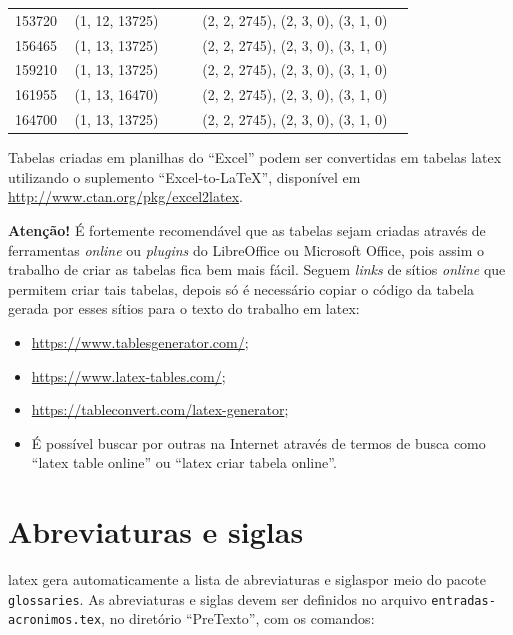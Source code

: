 \begin{longtable}{@{}p{0.14\linewidth}p{0.30\linewidth}p{0.50\linewidth}@{}}
153720 & (1, 12, 13725) & (2, 2, 2745), (2, 3, 0), (3, 1, 0)                  \\
156465 & (1, 13, 13725) & (2, 2, 2745), (2, 3, 0), (3, 1, 0)                  \\
159210 & (1, 13, 13725) & (2, 2, 2745), (2, 3, 0), (3, 1, 0)                  \\
161955 & (1, 13, 16470) & (2, 2, 2745), (2, 3, 0), (3, 1, 0)                  \\
164700 & (1, 13, 13725) & (2, 2, 2745), (2, 3, 0), (3, 1, 0)                  \\
\end{longtable}

Tabelas criadas em planilhas do ``Excel'' podem ser convertidas em tabelas \gls{latex} utilizando o suplemento ``Excel-to-LaTeX'', disponível em \url{http://www.ctan.org/pkg/excel2latex}.

\textbf{Atenção!} É fortemente recomendável que as tabelas sejam criadas através de ferramentas \textit{online} ou \textit{plugins} do LibreOffice ou Microsoft Office, pois assim o trabalho de criar as tabelas fica bem mais fácil. Seguem \textit{links} de sítios \textit{online} que permitem criar tais tabelas, depois só é necessário copiar o código da tabela gerada por esses sítios para o texto do trabalho em \gls{latex}:
\begin{itemize}
    \item \url{https://www.tablesgenerator.com/};
    \item \url{https://www.latex-tables.com/};
    \item \url{https://tableconvert.com/latex-generator};
    \item É possível buscar por outras na Internet através de termos de busca como ``latex table online'' ou ``latex criar tabela online''.
\end{itemize}

\section{Abreviaturas e siglas}\label{sec:acronimos}

\gls{latex} gera automaticamente a lista de abreviaturas e siglaspor meio do pacote \texttt{glossaries}. As abreviaturas e siglas devem ser definidos no arquivo \texttt{entradas-acronimos.tex}, no diretório ``PreTexto'', com os comandos:

